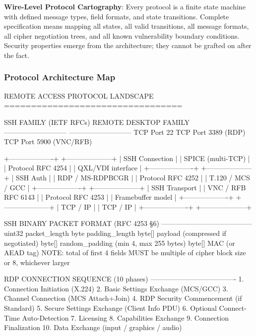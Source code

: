 \documentclass[11pt,letterpaper]{article}
\begin{document}
\textbf{Wire-Level Protocol Cartography}: Every protocol is a finite state machine with defined message types, field formats, and state transitions. Complete specification means mapping all states, all valid transitions, all message formats, all cipher negotiation trees, and all known vulnerability boundary conditions. Security properties emerge from the architecture; they cannot be grafted on after the fact.

\subsubsection{Protocol Architecture Map}

\begin{asciibox}
REMOTE ACCESS PROTOCOL LANDSCAPE
=================================

SSH FAMILY (IETF RFCs)            REMOTE DESKTOP FAMILY
---------------------------       ---------------------------
TCP Port 22                       TCP Port 3389 (RDP)
                                  TCP Port 5900 (VNC/RFB)

+-------------------+             +--------------------+
| SSH Connection    |             | SPICE (multi-TCP)  |
| Protocol RFC 4254 |             | QXL/VDI interface  |
+-------------------+             +--------------------+
| SSH Auth          |             | RDP / MS-RDPBCGR   |
| Protocol RFC 4252 |             | T.120 / MCS / GCC  |
+-------------------+             +--------------------+
| SSH Transport     |             | VNC / RFB RFC 6143 |
| Protocol RFC 4253 |             | Framebuffer model  |
+-------------------+             +--------------------+
| TCP / IP          |             | TCP / IP           |
+-------------------+             +--------------------+

SSH BINARY PACKET FORMAT (RFC 4253 §6)
---------------------------------------
 uint32  packet_length
 byte    padding_length
 byte[]  payload (compressed if negotiated)
 byte[]  random_padding (min 4, max 255 bytes)
 byte[]  MAC (or AEAD tag)
 NOTE: total of first 4 fields MUST be multiple
       of cipher block size or 8, whichever larger

RDP CONNECTION SEQUENCE (10 phases)
-------------------------------------
 1. Connection Initiation (X.224)
 2. Basic Settings Exchange (MCS/GCC)
 3. Channel Connection (MCS Attach+Join)
 4. RDP Security Commencement (if Standard)
 5. Secure Settings Exchange (Client Info PDU)
 6. Optional Connect-Time Auto-Detection
 7. Licensing
 8. Capabilities Exchange
 9. Connection Finalization
10. Data Exchange (input / graphics / audio)
\end{asciibox}
\end{document}
